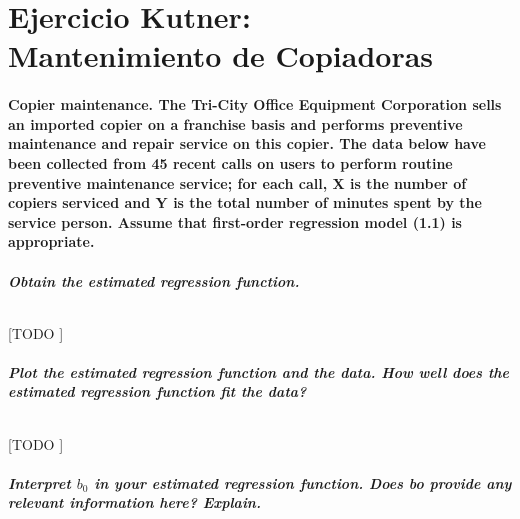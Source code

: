 \documentclass{article}
\begin{document}
  \maketitle


  \part{Ejercicio Kutner:\\ Mantenimiento de Copiadoras}

    \setcounter{section}{1}

    \setcounter{subsection}{19}
    \subsection{\textbf{Copier maintenance}. The Tri-City Office Equipment Corporation sells an imported copier on a franchise basis and performs preventive maintenance and repair service on this copier. The data below have been collected from 45 recent calls on users to perform routine preventive maintenance service; for each call, X is the number of copiers serviced and Y is the total number of minutes spent by the service person. Assume that first-order regression model (1.1) is appropriate.}

      \subsubsection{Obtain the estimated regression function.}

        \paragraph{}
        [TODO ]

      \subsubsection{Plot the estimated regression function and the data. How well does the estimated regression function fit the data?}

        \paragraph{}
        [TODO ]

      \subsubsection{Interpret $b_0$ in your estimated regression function. Does bo provide any relevant information here? Explain.}
\end{document}
